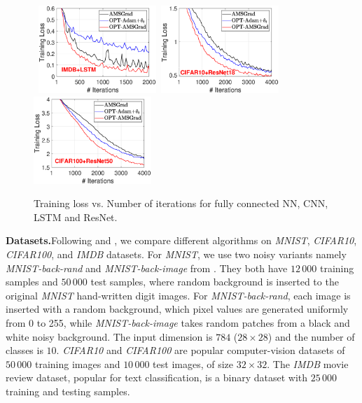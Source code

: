 \documentclass[wcp]{jmlr}
\begin{document}
\begin{figure}[t]
\mbox{\hspace{-0.2in}
\includegraphics[width=1.75in]{simulation/fig2/imdb_lstm_train_loss_no1.eps}\hspace{-0.1in}
\includegraphics[width=1.75in]{simulation/fig2/cifar10_resnet_train_loss.eps}\hspace{-0.1in}
\includegraphics[width=1.75in]{simulation/fig2/cifar100_resnet_train_loss.eps}
}
\caption{Training loss vs. Number of iterations for fully connected NN, CNN, LSTM and ResNet.}
\label{fig:train_loss}\vspace{-0.05in}
\end{figure}

\textbf{Datasets.}\hspace{0.1in}Following \cite{RKK18} and \cite{KB15}, we compare different algorithms on \textit{MNIST}, \textit{CIFAR10},
\textit{CIFAR100}, and \textit{IMDB} datasets. 
For \textit{MNIST}, we use two noisy variants namely \textit{MNIST-back-rand} and \textit{MNIST-back-image} from \cite{MNIST07}. 
They both have $12\,000$ training samples and $50\,000$ test samples, where random background is inserted to the original \textit{MNIST} hand-written digit images. 
For \textit{MNIST-back-rand}, each image is inserted with a random background, which pixel values are generated uniformly from 0 to 255, while \textit{MNIST-back-image} takes random patches from a black and white noisy background.
The input dimension is $784$ ($28\times 28$) and the number of classes is $10$. 
\textit{CIFAR10} and \textit{CIFAR100} are popular computer-vision datasets of $50\,000$ training images and $10\,000$ test images, of size $32\times 32$. 
The \textit{IMDB} movie review dataset, popular for text classification, is a binary dataset with $25\,000$ training and testing samples. 
\end{document}
